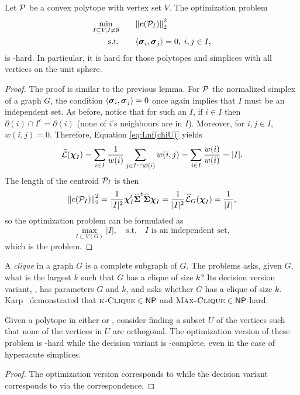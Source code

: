 \begin{lemma}
	Let $\P$ be a convex polytope with vertex set $V$. The optimization problem
	\begin{alignat*}{2}
	\min_{I\subset V, I\neq \emptyset} & \quad &&  {\norm{\cent(\P_I)}_2^2} \\
	\text{s.t.}&  &&  \la \sv_i,\sv_j\ra=0,\; i,j\in I,
	\end{alignat*}
	is \NP-hard. In particular, it is hard for those polytopes and simplices with all vertices on the unit sphere. 
\end{lemma}
\begin{proof}
	The proof is similar to the previous lemma. For $\P$ the normalized simplex of a graph $G$, the condition $\la \sv_i,\sv_j\ra=0$ once again implies that $I$ must be an independent set. As before, notice that for such an $I$, if $i\in I$ then $\partial(i) \cap I^c = \partial(i)$ (none of $i$'s neighbours are in $I$). Moreover, for $i,j\in I$, $w(i,j)=0$.  Therefore, Equation \eqref{eq:Lnf(chiU)} yields 
	\begin{align*}
	\Lnf(\bchi_I)=\sum_{i\in I}\frac{1}{w(i)}\sum_{j\in I^c\cap \partial(i)} w(i,j) = \sum_{i\in I}\frac{w(i)}{w(i)} = |I|.
	\end{align*}
	The  length  of the centroid  $\P_I$  is  then 
	\begin{align*}
	\norm{c(\P_I)}_2^2=\frac{1}{|I|^2}\bchi_I^\tp\Svn^\tp\Svn\bchi_I= \frac{1}{|I|^2}\Lnf_G(\bchi_I) =\frac{1}{|I|},
	\end{align*} 
	so the optimization problem can be formulated as 
	\[\max_{I\subset V(G)} |I|,\quad  \text{s.t.} \quad I \text{ is an independent set},\]
	which is the \iset problem. 
\end{proof}

A \emph{clique} in a graph $G$ is a complete subgraph of $G$. The \maxclique problems asks, given  $G$, what is the  largest  $k$ such that $G$ has a clique of size $k$? Its decision version variant, \kclique, has parameters $G$ and $k$, and asks whether $G$ has a clique of size $k$. Karp~\cite{karp1972reducibility} demonstrated that $\kclique\in\NP$ and $\maxclique\in\NP$-hard.  

\begin{lemma}
	Given a polytope in either  \vdesc or \hdesc, consider finding a subset $U$ of the vertices such that none of the vertices in $U$ are orthogonal. The optimization version  of these problem is \NP-hard  while the  decision variant is \NP-complete, even in the case of hyperacute simplices. 
\end{lemma}
\begin{proof}
	The optimization version corresponds to \maxclique while the decision variant corresponds to \kclique via the correspondence.   
\end{proof}



